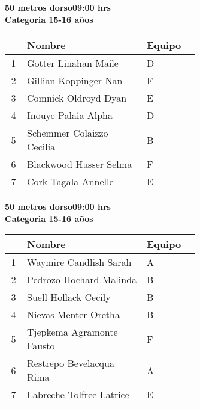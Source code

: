 \begin{minipage}{0.95\linewidth}\vspace{0.5cm} 
\begin{flushleft}
\textbf{
\hspace{-0.15cm}50 metros dorso\hspace{1.5cm}09:00 hrs \\Categoria 15-16 años}\vspace{-0.2cm} 
\end{flushleft}
\begin{tabular}{cp{0.63\linewidth}l}
\hline
& \textbf{Nombre} & \textbf{Equipo} \\ \hline
1 & Gotter Linahan Maile & D \\ 
2 & Gillian Koppinger Nan & F \\ 
3 & Comnick Oldroyd Dyan & E \\ 
4 & Inouye Palaia Alpha & D \\ 
5 & Schemmer Colaizzo Cecilia & B \\ 
6 & Blackwood Husser Selma & F \\ 
7 & Cork Tagala Annelle & E \\ 
\end{tabular}
\end{minipage}
\begin{minipage}{0.95\linewidth}\vspace{0.5cm} 
\begin{flushleft}
\textbf{
\hspace{-0.15cm}50 metros dorso\hspace{1.5cm}09:00 hrs \\Categoria 15-16 años}\vspace{-0.2cm} 
\end{flushleft}
\begin{tabular}{cp{0.63\linewidth}l}
\hline
& \textbf{Nombre} & \textbf{Equipo} \\ \hline
1 & Waymire Candlish Sarah & A \\ 
2 & Pedrozo Hochard Malinda & B \\ 
3 & Suell Hollack Cecily & B \\ 
4 & Nievas Menter Oretha & B \\ 
5 & Tjepkema Agramonte Fausto & F \\ 
6 & Restrepo Bevelacqua Rima & A \\ 
7 & Labreche Tolfree Latrice & E \\ 
\end{tabular}
\end{minipage}
